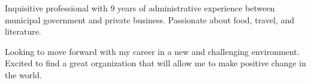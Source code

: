 

\begin{cvparagraph}

Inquisitive professional with 9 years of administrative experience between municipal government and private business.
Passionate about food, travel, and literature.

Looking to move forward with my career in a new and challenging environment.
Excited to find a great organization that will allow me to make positive change in the world.
\end{cvparagraph}
